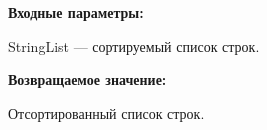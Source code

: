 \textbf{Входные параметры:}

StringList --- сортируемый список строк.

\textbf{Возвращаемое значение:}
 
Отсортированный список строк.
